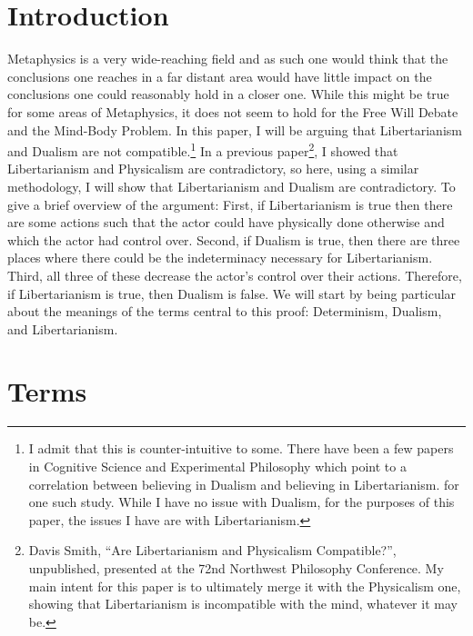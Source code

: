 \section{Introduction}
Metaphysics is a very wide-reaching field and as such one would think that the conclusions one reaches in a far distant area would have little impact on the conclusions one could reasonably hold in a closer one. While this might be true for some areas of Metaphysics, it does not seem to hold for the Free Will Debate and the Mind-Body Problem. In this paper, I will be arguing that Libertarianism and Dualism are not compatible.\footnote{I admit that this is counter-intuitive to some. There have been a few papers in Cognitive Science and Experimental Philosophy which point to a correlation between believing in Dualism and believing in Libertarianism. \cite{Wisniewski1} for one such study. While I have no issue with Dualism, for the purposes of this paper, the issues I have are with Libertarianism.}  In a previous paper\footnote{Davis Smith, “Are Libertarianism and Physicalism Compatible?”, unpublished, presented at the 72nd Northwest Philosophy Conference.  My main intent for this paper is to ultimately merge it with the Physicalism one, showing that Libertarianism is incompatible with the mind, whatever it may be.}, I showed that Libertarianism and Physicalism are contradictory, so here, using a similar methodology, I will show that Libertarianism and Dualism are contradictory. To give a brief overview of the argument:  First, if Libertarianism is true then there are some actions such that the actor could have physically done otherwise and which the actor had control over. Second, if Dualism is true, then there are three places where there could be the indeterminacy necessary for Libertarianism. Third, all three of these decrease the actor’s control over their actions.  Therefore, if Libertarianism is true, then Dualism is false. We will start by being particular about the meanings of the terms central to this proof: Determinism, Dualism, and Libertarianism.
\section{Terms}

